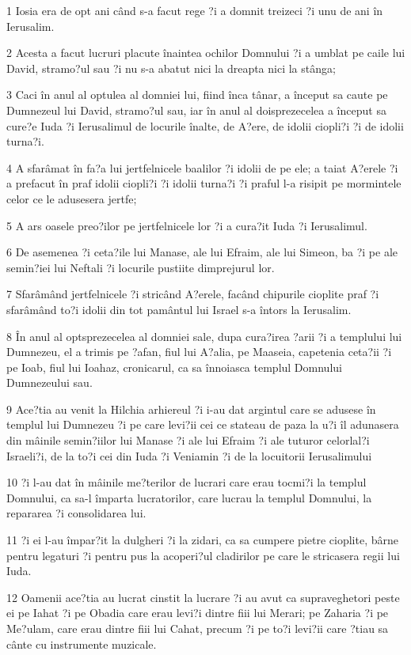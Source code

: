 \par 1 Iosia era de opt ani când s-a facut rege ?i a domnit treizeci ?i unu de ani în Ierusalim.
\par 2 Acesta a facut lucruri placute înaintea ochilor Domnului ?i a umblat pe caile lui David, stramo?ul sau ?i nu s-a abatut nici la dreapta nici la stânga;
\par 3 Caci în anul al optulea al domniei lui, fiind înca tânar, a început sa caute pe Dumnezeul lui David, stramo?ul sau, iar în anul al doisprezecelea a început sa cure?e Iuda ?i Ierusalimul de locurile înalte, de A?ere, de idolii ciopli?i ?i de idolii turna?i.
\par 4 A sfarâmat în fa?a lui jertfelnicele baalilor ?i idolii de pe ele; a taiat A?erele ?i a prefacut în praf idolii ciopli?i ?i idolii turna?i ?i praful l-a risipit pe mormintele celor ce le adusesera jertfe;
\par 5 A ars oasele preo?ilor pe jertfelnicele lor ?i a cura?it Iuda ?i Ierusalimul.
\par 6 De asemenea ?i ceta?ile lui Manase, ale lui Efraim, ale lui Simeon, ba ?i pe ale semin?iei lui Neftali ?i locurile pustiite dimprejurul lor.
\par 7 Sfarâmând jertfelnicele ?i stricând A?erele, facând chipurile cioplite praf ?i sfarâmând to?i idolii din tot pamântul lui Israel s-a întors la Ierusalim.
\par 8 În anul al optsprezecelea al domniei sale, dupa cura?irea ?arii ?i a templului lui Dumnezeu, el a trimis pe ?afan, fiul lui A?alia, pe Maaseia, capetenia ceta?ii ?i pe Ioab, fiul lui Ioahaz, cronicarul, ca sa înnoiasca templul Domnului Dumnezeului sau.
\par 9 Ace?tia au venit la Hilchia arhiereul ?i i-au dat argintul care se adusese în templul lui Dumnezeu ?i pe care levi?ii cei ce stateau de paza la u?i îl adunasera din mâinile semin?iilor lui Manase ?i ale lui Efraim ?i ale tuturor celorlal?i Israeli?i, de la to?i cei din Iuda ?i Veniamin ?i de la locuitorii Ierusalimului
\par 10 ?i l-au dat în mâinile me?terilor de lucrari care erau tocmi?i la templul Domnului, ca sa-l împarta lucratorilor, care lucrau la templul Domnului, la repararea ?i consolidarea lui.
\par 11 ?i ei l-au împar?it la dulgheri ?i la zidari, ca sa cumpere pietre cioplite, bârne pentru legaturi ?i pentru pus la acoperi?ul cladirilor pe care le stricasera regii lui Iuda.
\par 12 Oamenii ace?tia au lucrat cinstit la lucrare ?i au avut ca supraveghetori peste ei pe Iahat ?i pe Obadia care erau levi?i dintre fiii lui Merari; pe Zaharia ?i pe Me?ulam, care erau dintre fiii lui Cahat, precum ?i pe to?i levi?ii care ?tiau sa cânte cu instrumente muzicale.
